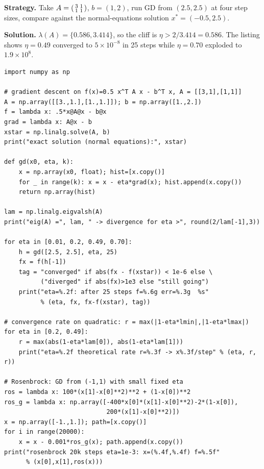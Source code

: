 \begin{example}\label{ex:gdquad}
\textbf{Strategy.} Take $A=\begin{psmallmatrix}3&1\\1&1\end{psmallmatrix}$,
$b=(1,2)$, run GD from $(2.5,2.5)$ at four step sizes, compare against
the normal-equations solution $x^{*}=(-0.5,2.5)$.

\textbf{Solution.} $\lambda(A)=\{0.586,3.414\}$, so the cliff is
$\eta>2/3.414=0.586$. The listing shows $\eta=0.49$ converged to
$5\times10^{-8}$ in 25 steps while $\eta=0.70$ exploded to $1.9\times10^{8}$.
\end{example}

\begin{lstlisting}[caption={\ttfamily code/ch14\_gd.py --- gradient
descent on a quadratic with the divergence threshold computed, then
Rosenbrock as the nonconvex reality check.}]
import numpy as np

# gradient descent on f(x)=0.5 x^T A x - b^T x, A = [[3,1],[1,1]]
A = np.array([[3.,1.],[1.,1.]]); b = np.array([1.,2.])
f = lambda x: .5*x@A@x - b@x
grad = lambda x: A@x - b
xstar = np.linalg.solve(A, b)
print("exact solution (normal equations):", xstar)

def gd(x0, eta, k):
    x = np.array(x0, float); hist=[x.copy()]
    for _ in range(k): x = x - eta*grad(x); hist.append(x.copy())
    return np.array(hist)

lam = np.linalg.eigvalsh(A)
print("eig(A) =", lam, " -> divergence for eta >", round(2/lam[-1],3))

for eta in [0.01, 0.2, 0.49, 0.70]:
    h = gd([2.5, 2.5], eta, 25)
    fx = f(h[-1])
    tag = "converged" if abs(fx - f(xstar)) < 1e-6 else \
          ("diverged" if abs(fx)>1e3 else "still going")
    print("eta=%.2f: after 25 steps f=%.6g err=%.3g  %s"
          % (eta, fx, fx-f(xstar), tag))

# convergence rate on quadratic: r = max(|1-eta*lmin|,|1-eta*lmax|)
for eta in [0.2, 0.49]:
    r = max(abs(1-eta*lam[0]), abs(1-eta*lam[1]))
    print("eta=%.2f theoretical rate r=%.3f -> x%.3f/step" % (eta, r, r))

# Rosenbrock: GD from (-1,1) with small fixed eta
ros = lambda x: 100*(x[1]-x[0]**2)**2 + (1-x[0])**2
ros_g = lambda x: np.array([-400*x[0]*(x[1]-x[0]**2)-2*(1-x[0]),
                            200*(x[1]-x[0]**2)])
x = np.array([-1.,1.]); path=[x.copy()]
for i in range(20000):
    x = x - 0.001*ros_g(x); path.append(x.copy())
print("rosenbrock 20k steps eta=1e-3: x=(%.4f,%.4f) f=%.5f"
      % (x[0],x[1],ros(x)))
\end{lstlisting}

